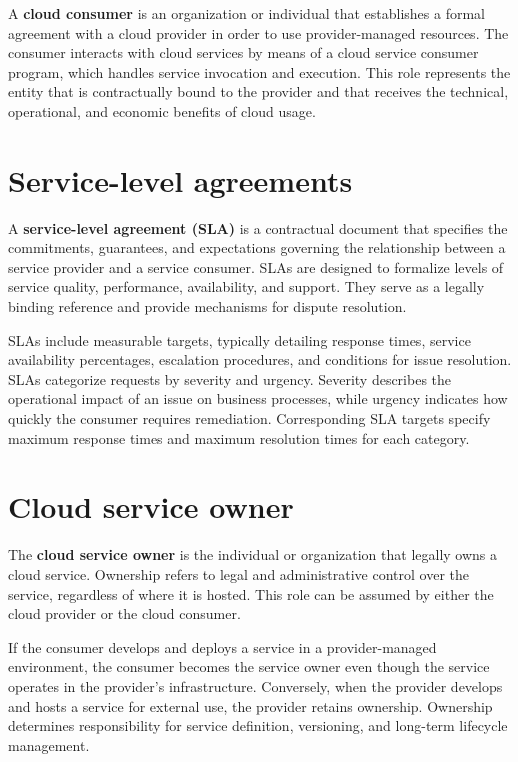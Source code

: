 \documentclass[11pt,a4paper,openany]{report}
\begin{document}
A \textbf{cloud consumer} is an organization or individual that establishes a formal agreement with a cloud provider in order to use provider-managed resources. The consumer interacts with cloud services by means of a cloud service consumer program, which handles service invocation and execution. This role represents the entity that is contractually bound to the provider and that receives the technical, operational, and economic benefits of cloud usage.

\section{Service-level agreements}

A \textbf{service-level agreement (SLA)} is a contractual document that specifies the commitments, guarantees, and expectations governing the relationship between a service provider and a service consumer. SLAs are designed to formalize levels of service quality, performance, availability, and support. They serve as a legally binding reference and provide mechanisms for dispute resolution.

SLAs include measurable targets, typically detailing response times, service availability percentages, escalation procedures, and conditions for issue resolution. SLAs categorize requests by severity and urgency. Severity describes the operational impact of an issue on business processes, while urgency indicates how quickly the consumer requires remediation. Corresponding SLA targets specify maximum response times and maximum resolution times for each category.

\section{Cloud service owner}

The \textbf{cloud service owner} is the individual or organization that legally owns a cloud service. Ownership refers to legal and administrative control over the service, regardless of where it is hosted. This role can be assumed by either the cloud provider or the cloud consumer.

If the consumer develops and deploys a service in a provider-managed environment, the consumer becomes the service owner even though the service operates in the provider's infrastructure. Conversely, when the provider develops and hosts a service for external use, the provider retains ownership. Ownership determines responsibility for service definition, versioning, and long-term lifecycle management.
\end{document}
